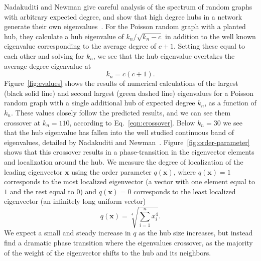 \documentclass[twocolumn,prl,superscriptaddress]{revtex4}
\renewcommand{\vec}{\mathbf}
\begin{document}
Nadakuditi and Newman give careful analysis of the spectrum of random graphs with arbitrary expected degree, and show that high degree hubs in a network generate their own eigenvalues~\cite{nadakuditi13}. For the Poisson random graph with a planted hub, they calculate a hub eigenvalue of $k_n / \sqrt{k_n - c}$ in addition to the well known eigenvalue corresponding to the average degree of $c+1$. Setting these equal to each other and solving for $k_n$, we see that the hub eigenvalue overtakes the average degree eigenvalue at
\begin{equation}
k_n = c(c+1).
\label{eqn:crossover}
\end{equation}
Figure~\ref{fig:evalues} shows the results of numerical calculations of the largest (black solid line) and second largest (green dashed line) eigenvalues for a Poisson random graph with a single additional hub of expected degree $k_n$, as a function of $k_n$. These values closely follow the predicted results, and we can see them crossover at $k_n = 110$, according to Eq.~\ref{eqn:crossover}. Below $k_n = 30$ we see that the hub eigenvalue has fallen into the well studied continuous band of eigenvalues, detailed by Nadakuditi and Newman~\cite{nadakuditi13}. Figure~\ref{fig:order-parameter} shows that this crossover results in a phase-transition in the eigenvector elements and localization around the hub. We measure the degree of localization of the leading eigenvector $\vec{x}$ using the order parameter $q(\vec{x})$, where $q(\vec{x}) = 1$ corresponds to the most localized eigenvector (a vector with one element equal to $1$ and the rest equal to $0$) and $q(\vec{x}) = 0$ corresponds to the least localized eigenvector (an infinitely long uniform vector)
\[q(\vec{x}) = \sqrt[4]{\sum_{i=1}^n x_i ^ 4}.\]
We expect a small and steady increase in $q$ as the hub size increases, but instead find a dramatic phase transition where the eigenvalues crossover, as the majority of the weight of the eigenvector shifts to the hub and its neighbors.
\end{document}
